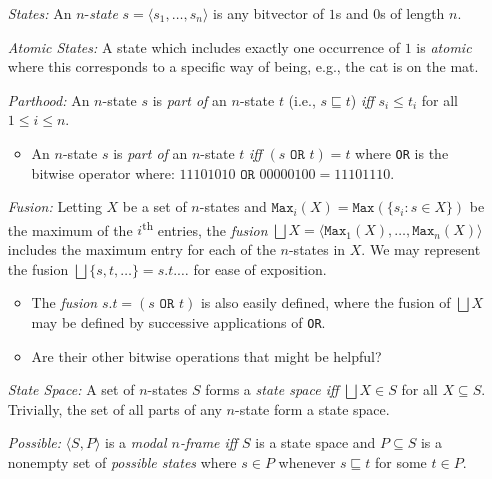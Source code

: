 \documentclass[a4paper, 11pt]{article} %
\newcommand{\tuple}[1]{\langle#1\rangle} %
\newcommand{\set}[1]{\lbrace#1\rbrace} %
\renewcommand{\max}[0]{\texttt{Max}}
\begin{document}
\begin{enumerate}
  \item[\it States:] An $n$-\textit{state} $s=\tuple{s_1,\ldots,s_n}$ is any bitvector of $1$s and $0$s of length $n$.
  \item[\it Atomic States:] A state which includes exactly one occurrence of $1$ is \textit{atomic} where this corresponds to a specific way of being, e.g., the cat is on the mat.
  \item[\it Parthood:] An $n$-state $s$ is \textit{part of} an $n$-state $t$ (i.e., $s\sqsubseteq t$) \textit{iff} $s_i\leq t_i$ for all $1\leq i\leq n$.
    \begin{itemize}
      \item An $n$-state $s$ is \textit{part of} an $n$-state $t$ \textit{iff} $(s \texttt{ OR } t) = t$  where \texttt{OR} is the bitwise operator where: $11101010 \texttt{ OR } 00000100 = 11101110$. %
    \end{itemize}
  \item[\it Fusion:] Letting $X$ be a set of $n$-states and $\max_i(X)=\max(\set{s_i:s\in X})$ be the maximum of the $i$\textsuperscript{th} entries, the \textit{fusion} $\bigsqcup X=\tuple{\max_1(X),\ldots,\max_n(X)}$ includes the maximum entry for each of the $n$-states in $X$.
    We may represent the fusion $\bigsqcup\set{s,t,\ldots}=s.t.\ldots$ for ease of exposition.
    \begin{itemize}
      \item The \textit{fusion} $s.t = (s \texttt{ OR } t)$ is also easily defined, where the fusion of $\bigsqcup X$ may be defined by successive applications of \texttt{OR}.
      \item Are their other bitwise operations that might be helpful?
    \end{itemize}
  \item[\it State Space:] A set of $n$-states $S$ forms a \textit{state space iff} $\bigsqcup X\in S$ for all $X\subseteq S$. Trivially, the set of all parts of any $n$-state form a state space.
  \item[\it Possible:] $\tuple{S,P}$ is a \textit{modal $n$-frame iff} $S$ is a state space and $P\subseteq S$ is a nonempty set of \textit{possible states} where $s\in P$ whenever $s\sqsubseteq t$ for some $t\in P$.

\end{enumerate}
\end{document}
